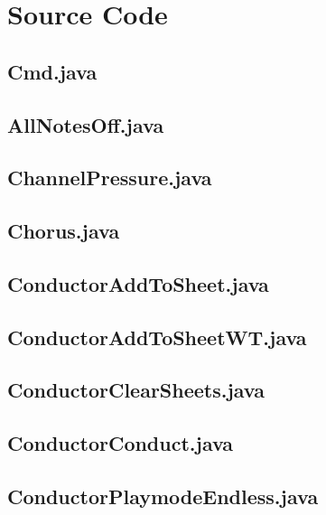 \section{Source Code}

\subsection{ Cmd.java }

\subsection{ AllNotesOff.java }

\subsection{ ChannelPressure.java }

\subsection{ Chorus.java }

\subsection{ ConductorAddToSheet.java }

\subsection{ ConductorAddToSheetWT.java }

\subsection{ ConductorClearSheets.java }

\subsection{ ConductorConduct.java }

\subsection{ ConductorPlaymodeEndless.java }


